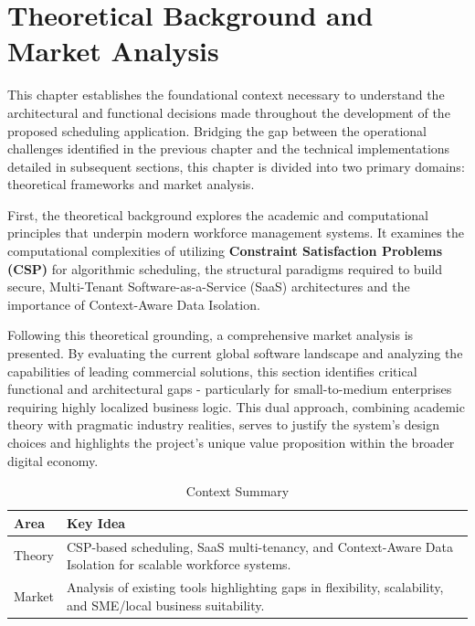 \chapter{Theoretical Background and Market Analysis}
\label{chap:ch1}

This chapter establishes the foundational context necessary to understand the architectural and functional decisions made throughout the development of the proposed scheduling application. Bridging the gap between the operational challenges identified in the previous chapter and the technical implementations detailed in subsequent sections, this chapter is divided into two primary domains: theoretical frameworks and market analysis.

First, the theoretical background explores the academic and computational principles that underpin modern workforce management systems. It examines the computational complexities of utilizing \textbf{Constraint Satisfaction Problems (CSP)} \cite{csp_processing} for algorithmic scheduling, the structural paradigms required to build secure, Multi-Tenant Software-as-a-Service (SaaS) architectures and the importance of Context-Aware Data Isolation. \cite{ContextAwareDataIsolation}

Following this theoretical grounding, a comprehensive market analysis is presented. By evaluating the current global software landscape and analyzing the capabilities of leading commercial solutions, this section identifies critical functional and architectural gaps - particularly for small-to-medium enterprises requiring highly localized business logic. This dual approach, combining academic theory with pragmatic industry realities, serves to justify the system's design choices and highlights the project's unique value proposition within the broader digital economy.

\begin{table}[H]
\centering
\caption{Context Summary}
\label{tab:chapter_context}
\renewcommand{\arraystretch}{0.8}
\begin{tabular}{|p{4.5cm}|p{11cm}|}
\hline
\textbf{Area} & \textbf{Key Idea} \\ \hline
Theory & CSP-based scheduling, SaaS multi-tenancy, and Context-Aware Data Isolation for scalable workforce systems. \\ \hline
Market & Analysis of existing tools highlighting gaps in flexibility, scalability, and SME/local business suitability. \\ \hline
\end{tabular}
\end{table}


